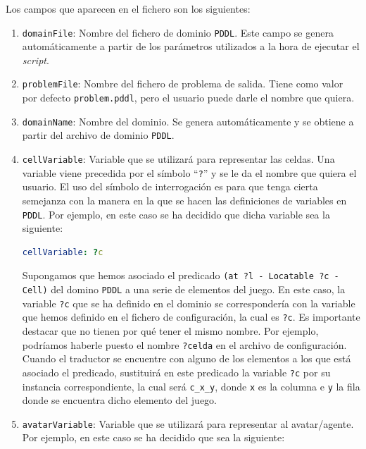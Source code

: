 Los campos que aparecen en el fichero son los siguientes:

\begin{enumerate}
    \item \texttt{domainFile}: Nombre del fichero de dominio \texttt{PDDL}. Este campo se genera
    automáticamente a partir de los parámetros utilizados a la hora de ejecutar el \textit{script}.
    
    \item \texttt{problemFile}: Nombre del fichero de problema de salida. Tiene como valor por defecto
    \texttt{problem.pddl}, pero el usuario puede darle el nombre que quiera.
    
    \item \texttt{domainName}: Nombre del dominio. Se genera automáticamente y se obtiene a partir del
    archivo de dominio \texttt{PDDL}.
    
    \item  \label{enum:cell} \texttt{cellVariable}: Variable que se utilizará para representar las celdas. Una
    variable viene precedida por el símbolo ``\texttt{?}'' y se le da el nombre que quiera el usuario. El uso del
    símbolo de interrogación es para que tenga cierta semejanza con la manera en la que se hacen las definiciones
    de variables en \texttt{PDDL}. Por ejemplo, en este caso se ha decidido que dicha variable sea la
    siguiente:
    
    \begin{lstlisting}[language=yaml]
cellVariable: ?c
    \end{lstlisting}
    
    Supongamos que hemos asociado el predicado \texttt{(at ?l - Locatable ?c - Cell)} del domino
    \texttt{PDDL} a una serie de elementos del juego. En este caso, la variable \texttt{?c} que se ha
    definido en el dominio se correspondería con la variable que hemos definido en el fichero de configuración,
    la cual es \texttt{?c}. Es importante destacar que no tienen por qué tener el mismo nombre. Por ejemplo,
    podríamos haberle puesto el nombre \texttt{?celda} en el archivo de configuración. Cuando el traductor se
    encuentre con alguno de los elementos a los que está asociado el predicado, sustituirá en este predicado la variable \texttt{?c} por su instancia correspondiente, la cual será \texttt{c\_x\_y}, donde \texttt{x} es la
    columna e \texttt{y} la fila donde se encuentra dicho elemento del juego.
    
    \item \texttt{avatarVariable}: Variable que se utilizará para representar al avatar/agente. Por
    ejemplo, en este caso se ha decidido que sea la siguiente:
    

\end{enumerate}

